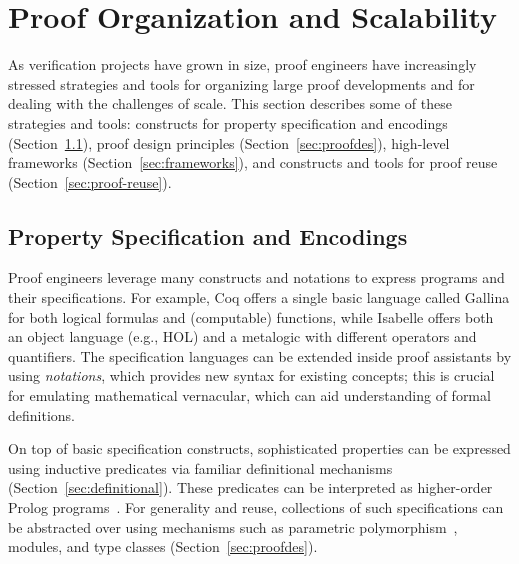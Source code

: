 \chapter{Proof Organization and Scalability}
\label{ch:organization}

As verification projects have grown in size, proof engineers have increasingly
stressed strategies and tools for organizing large proof developments and for dealing
with the challenges of scale.
This section describes some of these strategies and tools:
constructs for property specification and encodings (Section~\ref{sec:specenc}), proof design principles (Section~\ref{sec:proofdes}),
high-level frameworks (Section~\ref{sec:frameworks}), and constructs and tools for proof reuse (Section~\ref{sec:proof-reuse}).



\section{Property Specification and Encodings}
\label{sec:specenc}

Proof engineers leverage many constructs and notations to express programs and their specifications. For example, Coq offers a single basic language called Gallina for both logical formulas and (computable) functions, while Isabelle offers both an object language (e.g., HOL) and a metalogic with different operators and quantifiers. The specification languages can be extended inside proof assistants by using \emph{notations}, which provides new syntax for existing concepts; this is crucial for emulating mathematical vernacular, which can aid understanding of formal definitions.

On top of basic specification constructs, sophisticated properties can be expressed using inductive predicates via familiar definitional
mechanisms (Section~\ref{sec:definitional}). These predicates can be interpreted as higher-order Prolog programs~\citep{CoqArt}. For generality and reuse, collections of such specifications can be abstracted over using mechanisms such as parametric polymorphism~\citep{Strachey2000}, modules, and type classes (Section~\ref{sec:proofdes}).

